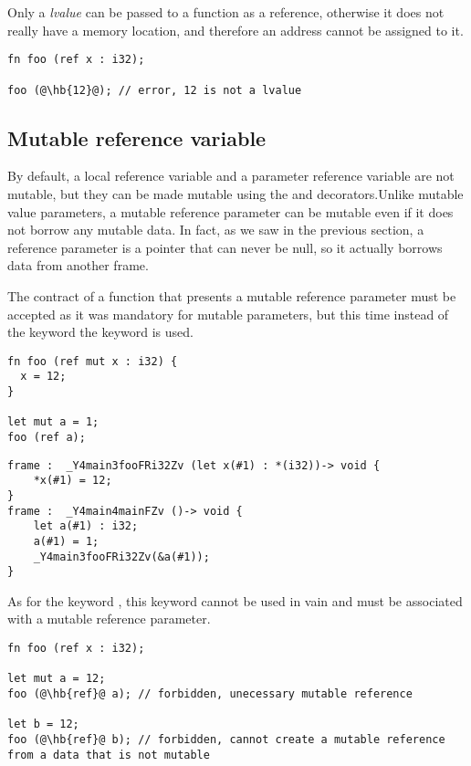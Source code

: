 Only a \textit{lvalue} can be passed to a function as a reference, otherwise it
does not really have a memory location, and therefore an address cannot be
assigned to it.

\begin{lstlisting}[style=coloredverbatim, escapechar=@]
fn foo (ref x : i32);

foo (@\hb{12}@); // error, 12 is not a lvalue
\end{lstlisting}

\subsection {Mutable reference variable}
\label{sec:mut_ref_param}

By default, a local reference variable and a parameter reference variable are
not mutable, but they can be made mutable using the  and 
decorators.Unlike mutable value parameters, a mutable reference parameter can be
mutable even if it does not borrow any mutable data. In fact, as we saw in the
previous section, a reference parameter is a pointer that can never be null, so
it actually borrows data from another frame.

The contract of a function that presents a mutable reference parameter must be
accepted as it was mandatory for mutable parameters, but this time instead of
the keyword  the keyword  is used.

\begin{lstlisting}[style=coloredverbatim]
fn foo (ref mut x : i32) {
  x = 12;
}

let mut a = 1;
foo (ref a);
\end{lstlisting}

\begin {lstlisting}[style=lyilVerb]
frame :  _Y4main3fooFRi32Zv (let x(#1) : *(i32))-> void {
    *x(#1) = 12;
}
frame :  _Y4main4mainFZv ()-> void {
    let a(#1) : i32;
    a(#1) = 1;
    _Y4main3fooFRi32Zv(&a(#1));
}
\end{lstlisting}

As for the keyword , this keyword  cannot be used in
vain and must be associated with a mutable reference parameter.

\begin{lstlisting}[style=coloredverbatim, escapechar=@]
fn foo (ref x : i32);

let mut a = 12;
foo (@\hb{ref}@ a); // forbidden, unecessary mutable reference

let b = 12;
foo (@\hb{ref}@ b); // forbidden, cannot create a mutable reference from a data that is not mutable
\end{lstlisting}

